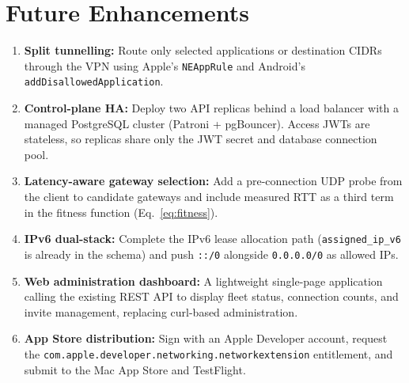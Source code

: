 \documentclass[12pt,a4paper]{report}
\begin{document}
\chapter{Future Enhancements}

\begin{enumerate}[leftmargin=*, topsep=2pt, itemsep=3pt]
  \item \textbf{Split tunnelling:} Route only selected applications or destination CIDRs through the VPN using Apple's \texttt{NEAppRule} and Android's \texttt{addDisallowedApplication}.
  \item \textbf{Control-plane HA:} Deploy two API replicas behind a load balancer with a managed PostgreSQL cluster (Patroni + pgBouncer). Access JWTs are stateless, so replicas share only the JWT secret and database connection pool.
  \item \textbf{Latency-aware gateway selection:} Add a pre-connection UDP probe from the client to candidate gateways and include measured RTT as a third term in the fitness function (Eq.~\ref{eq:fitness}).
  \item \textbf{IPv6 dual-stack:} Complete the IPv6 lease allocation path (\texttt{assigned\_ip\_v6} is already in the schema) and push \texttt{::/0} alongside \texttt{0.0.0.0/0} as allowed IPs.
  \item \textbf{Web administration dashboard:} A lightweight single-page application calling the existing REST API to display fleet status, connection counts, and invite management, replacing curl-based administration.
  \item \textbf{App Store distribution:} Sign with an Apple Developer account, request the \texttt{com.apple.developer.networking.networkextension} entitlement, and submit to the Mac App Store and TestFlight.
\end{enumerate}

\printbibliography[title={References},heading=bibintoc]
\end{document}
